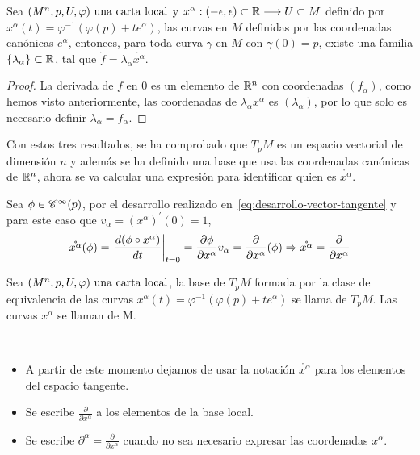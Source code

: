 \begin{proposition}
  Sea $(M^n,p,U,\varphi)\textmd{ una carta local}$ y $
  x^\alpha:(-\epsilon, \epsilon)
  \subset\mathbb{R}\longrightarrow U\subset M$ definido por $x^\alpha(t)=\varphi^{-1}(\varphi(p)+te^\alpha)$, las curvas en
  $M$
  definidas por las coordenadas canónicas $e^\alpha$, entonces, para toda curva $\gamma$ en $M$ con
  $\gamma(0)=p$, existe una familia
  $\{\lambda_\alpha\}\subset\mathbb{R}$, tal que
  $\mathring{f}=\lambda_\alpha\mathring{x^\alpha}$.
\end{proposition}
\begin{proof}
  La derivada de $f$ en $0$ es un elemento de $\mathbb{R}^n$ con coordenadas $(f_\alpha)$, como hemos visto
  anteriormente, las coordenadas de $\lambda_\alpha x^\alpha$ es $(\lambda_\alpha)$, por lo que
  solo es necesario definir $\lambda_\alpha=f_\alpha$.
\end{proof}

Con estos tres resultados, se ha comprobado que $T_pM$ es un espacio vectorial de dimensión $n$
y además se ha definido una base que usa las coordenadas canónicas de $\mathbb{R}^n$, ahora se va calcular una expresión para
identificar quien es $\mathring{x^\alpha}$.

Sea $\phi\in\mathscr{C}^\infty(p)$, por el desarrollo realizado en~\ref{eq:desarrollo-vector-tangente} y para este caso
que $v_\alpha=(x^\alpha)^{'}(0)=1$,
\[
  \mathring{x^\alpha}(\phi)=\left.\frac{d(\phi\circ x^\alpha)
  }{dt}\right|_{t=0}=\frac{\partial\phi}{\partial x^\alpha}v_\alpha=\frac{\partial}{\partial x^\alpha}(\phi)
  \Rightarrow\mathring{x^\alpha}=\frac{\partial}{\partial x^\alpha}
\]
\begin{definition}
  Sea $(M^n,p,U,\varphi)\textmd{ una carta local}$, la base de $T_p M$ formada por la clase de equivalencia de las curvas
  $x^\alpha(t)=\varphi^{-1}(\varphi(p)+te^\alpha)$ se llama  de
  $T_p M$.
  Las curvas $x^\alpha$ se llaman  de M\@.
\end{definition}
\begin{notation}
  \
  \begin{itemize}
    \item A partir de este momento dejamos de usar la notación $\mathring{x^\alpha}$ para los elementos del espacio
    tangente.
    \item Se escribe $\frac{\partial}{\partial x^\alpha}$ a los elementos de la base local.
    \item Se escribe $\partial^\alpha=\frac{\partial}{\partial x^\alpha}$ cuando no sea necesario expresar las coordenadas
    $x^\alpha$.
  \end{itemize}

\end{notation}